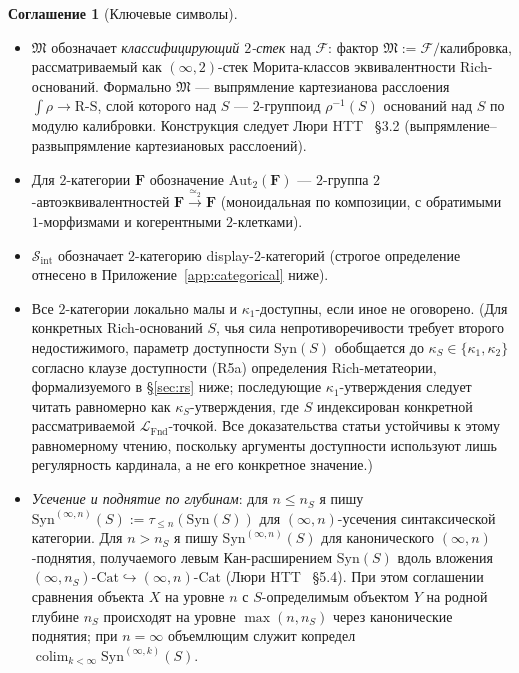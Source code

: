 \documentclass[11pt]{article}
\theoremstyle{plain}
\theoremstyle{definition}
\newtheorem{convention}[theorem]{Соглашение}
\newcommand{\cS}{\mathcal{S}}
\newcommand{\cF}{\mathcal{F}}
\newcommand{\fM}{\mathfrak{M}}
\newcommand{\LFnd}{\mathcal{L}_{\mathrm{Fnd}}}
\newcommand{\Sint}{\cS_{\mathrm{int}}}
\newcommand{\Cat}{\mathrm{Cat}}
\newcommand{\Syn}{\mathrm{Syn}}
\DeclareMathOperator{\colim}{colim}
\begin{document}
\begin{convention}[Ключевые символы]
\begin{itemize}
\item $\fM$ обозначает \emph{классифицирующий $2$-стек} над $\cF$: фактор $\fM := \cF / \text{калибровка}$, рассматриваемый как $(\infty, 2)$-стек Морита-классов эквивалентности Rich-оснований. Формально $\fM$ — выпрямление картезианова расслоения $\int \rho \to \mathrm{R\text{-}S}$, слой которого над $S$ — $2$-группоид $\rho^{-1}(S)$ оснований над $S$ по модулю калибровки. Конструкция следует Люри HTT~\cite{LurieHTT} \S 3.2 (выпрямление--развыпрямление картезиановых расслоений).
\item Для $2$-категории $\mathbf{F}$ обозначение $\mathrm{Aut}_2(\mathbf{F})$ — $2$-группа $2$-автоэквивалентностей $\mathbf{F} \xrightarrow{\simeq_2} \mathbf{F}$ (моноидальная по композиции, с обратимыми $1$-морфизмами и когерентными $2$-клетками).
\item $\Sint$ обозначает $2$-категорию display-$2$-категорий (строгое определение отнесено в Приложение~\ref{app:categorical} ниже).
\item Все $2$-категории локально малы и $\kappa_1$-доступны, если иное не оговорено. (Для конкретных Rich-оснований $S$, чья сила непротиворечивости требует второго недостижимого, параметр доступности $\Syn(S)$ обобщается до $\kappa_S \in \{\kappa_1, \kappa_2\}$ согласно клаузе доступности (R5a) определения Rich-метатеории, формализуемого в \S\ref{sec:rs} ниже; последующие $\kappa_1$-утверждения следует читать равномерно как $\kappa_S$-утверждения, где $S$ индексирован конкретной рассматриваемой $\LFnd$-точкой. Все доказательства статьи устойчивы к этому равномерному чтению, поскольку аргументы доступности используют лишь регулярность кардинала, а не его конкретное значение.)
\item \emph{Усечение и поднятие по глубинам}: для $n \leq n_S$ я пишу $\Syn^{(\infty, n)}(S) := \tau_{\leq n}(\Syn(S))$ для $(\infty, n)$-усечения синтаксической категории. Для $n > n_S$ я пишу $\Syn^{(\infty, n)}(S)$ для канонического $(\infty, n)$-поднятия, получаемого левым Кан-расширением $\Syn(S)$ вдоль вложения $(\infty, n_S)\text{-}\Cat \hookrightarrow (\infty, n)\text{-}\Cat$ (Люри HTT~\cite{LurieHTT} \S 5.4). При этом соглашении сравнения объекта $X$ на уровне $n$ с $S$-определимым объектом $Y$ на родной глубине $n_S$ происходят на уровне $\max(n, n_S)$ через канонические поднятия; при $n = \infty$ объемлющим служит копредел $\colim_{k < \infty} \Syn^{(\infty, k)}(S)$.
\end{itemize}
\end{convention}
\end{document}
